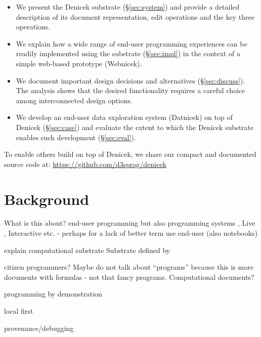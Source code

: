 \documentclass[sigconf,anonymous,screen]{acmart}
\begin{document}
\begin{itemize}
\item We present the Denicek substrate (\S\ref{sec:system}) and provide a detailed description of its
  document representation, edit operations and the key three operations.
\item We explain how a wide range of end-user programming experiences can be readily implemented using
  the substrate (\S\ref{sec:impl}) in the context of a simple web-based prototype (Webnicek).
\item We document important design decisions and alternatives (\S\ref{sec:discuss}). The analysis
  shows that the desired functionality requires a careful choice among interconnected design options.
\item We develop an end-user data exploration system (Datnicek) on top of Denicek (\S\ref{sec:case})
  and evaluate the extent to which the Denicek substrate enables such development (\S\ref{sec:eval}).
\end{itemize}

\noindent
To enable others build on top of Denicek, we share our compact and documented
source code at: \url{https://github.com/d3sprog/denicek}


\section{Background}
What is this about? end-user programming \cite{myers-2006-eup}
but also programming systems \cite{jakubovic-2023-techdims},
Live \cite{rein-2019-live}, Interactive etc. - perhaps for a lack of better term use end-user
(also notebooks)

explain computational substrate
Substrate defined by \cite{jakubovic-2022-ladder}

citizen programmers? Maybe do not talk about ``programs'' because this is more documents with
formulas - not that fancy programs. Computational documents?



programming by demonstration
\cite{leiva-2021-rapido,cypher-1993-pbd}
\cite{chen-2023-miwa}

local first
\cite{kleppmann-2019-local,klokmose-2024-mywebstrates}

provenance/debugging
\cite{ko-2004-whyline,ko-2009-whyline,krebs-2023-probelog}
\cite{ricciotti-2017-imperative,perera-2012-functional}
\cite{perera-2022-linked}
\end{document}
